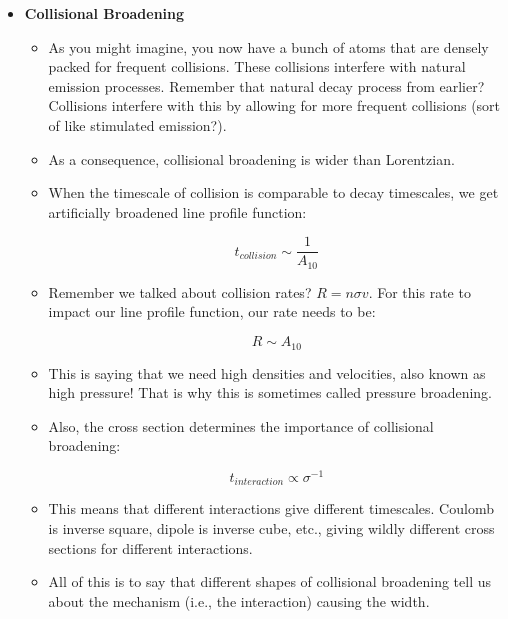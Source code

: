 \documentclass{article}
\begin{document}
\begin{itemize}
    \item \textbf{Collisional Broadening}
    
    \begin{itemize}
        \item As you might imagine, you now have a bunch of atoms that are densely packed for frequent collisions. These collisions interfere with natural emission processes. Remember that natural decay process from earlier? Collisions interfere with this by allowing for more frequent collisions (sort of like stimulated emission?). 
        
        \item As a consequence, collisional broadening is wider than Lorentzian.
        
        \item When the timescale of collision is comparable to decay timescales, we get artificially broadened line profile function:
        
        \begin{equation}
            t_{collision} \sim \frac{1}{A_{10}}
        \end{equation}
        
        \item Remember we talked about collision rates? $R = n \sigma v$. For this rate to impact our line profile function, our rate needs to be:
        
        \begin{equation}
            R \sim A_{10}
        \end{equation}
        
        \item This is saying that we need high densities and velocities, also known as high pressure! That is why this is sometimes called pressure broadening.
        
        \item Also, the cross section determines the importance of collisional broadening:
        
        \begin{equation}
            t_{interaction} \propto \sigma^{-1}
        \end{equation}
        
        \item This means that different interactions give different timescales. Coulomb is inverse square, dipole is inverse cube, etc., giving wildly different cross sections for different interactions. 
        
        \item All of this is to say that different shapes of collisional broadening tell us about the mechanism (i.e., the interaction) causing the width. 
        
        
    \end{itemize}
\end{itemize}
\end{document}
